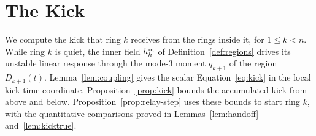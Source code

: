 \section{The Kick}
\label{sec:kick}

We compute the kick that ring $k$ receives from the rings inside it,
for $1\le k<n$. While ring $k$ is quiet, the inner field $h^{\mathrm{in}}_k$ of
Definition~\ref{def:regions} drives its unstable linear response through the
mode-$3$ moment $q_{k+1}$ of the region $D_{k+1}(t)$.
Lemma~\ref{lem:coupling} gives the scalar Equation~\eqref{eq:kick} in the local
kick-time coordinate. Proposition~\ref{prop:kick} bounds the accumulated kick
from above and below. Proposition~\ref{prop:relay-step} uses these bounds
to start ring $k$, with the quantitative comparisons proved in
Lemmas~\ref{lem:handoff} and~\ref{lem:kicktrue}.

